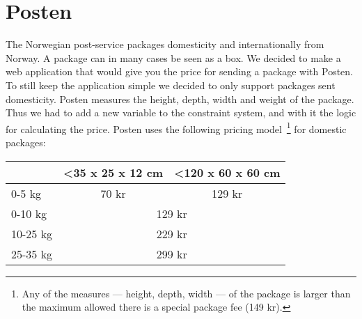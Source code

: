 \section{Posten}
The Norwegian post-service packages domesticity and internationally from Norway. 
A package can in many cases be seen as a box. We decided to make a web application 
that would give you the price for sending a package with Posten. To still keep the 
application simple we decided to only support packages sent domesticity. Posten 
measures the height, depth, width and weight of the package. Thus we had to add a new 
variable to the constraint system, and with it the logic for calculating the price. 
Posten uses the following pricing 
model~\cite{postenNorgespakken}\footnote{Any of the measures --- height, depth, width --- of the package is larger than the maximum allowed there is a special package fee (149 kr).} 
for domestic packages:
\begin{table}[h]
    \centering
    \begin{tabular}{|l|cl|}
    \hline
             & \multicolumn{1}{l|}{\textless 35 x 25 x 12 cm} & \textless 120 x 60 x 60 cm  \\ \hline
    0-5 kg   & \multicolumn{1}{c|}{70 kr}                     & \multicolumn{1}{c|}{129 kr} \\ \hline
    0-10 kg  & \multicolumn{2}{c|}{129 kr}                                                  \\ \hline
    10-25 kg & \multicolumn{2}{c|}{229 kr}                                                  \\ \hline
    25-35 kg & \multicolumn{2}{c|}{299 kr}                                                  \\ \hline
    \end{tabular}
\end{table}

